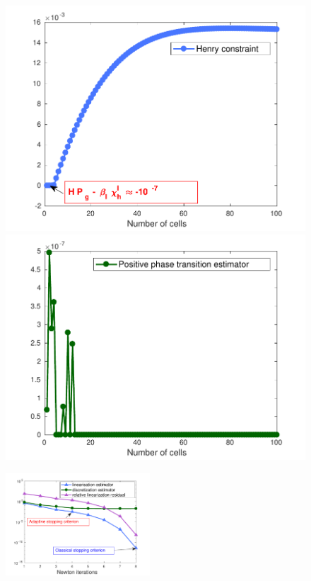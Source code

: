 \documentclass[10 pt]{beamer}
\begin{document}
\begin{frame}
\begin{figure}
\begin{minipage}[c]{.35\linewidth}
   \centering
\includegraphics[width=\textwidth]{image/modif_image_Henry_constraint}    
\end{minipage}\hfill
\begin{minipage}[c]{.35\linewidth}
   \centering
\includegraphics[width=\textwidth]{image/image_positive_phase_transition_estimator_modif}    
\end{minipage}
\end{figure}
\begin{figure}
  \centering
\includegraphics[width=0.48\textwidth]{image/modif_image_estimator_diphasique_time1}    
\end{figure}
\end{frame}
\end{document}
